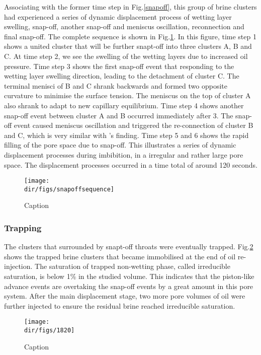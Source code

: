  Associating with the former time step in Fig.\ref{snapoff}, this group of brine clusters had experienced a series of dynamic displacement process of wetting layer swelling, snap-off, another snap-off and meniscus oscillation, reconnection and final snap-off. The complete sequence is shown in Fig.\ref{snapoffsequence}. In this figure, time step 1 shows a united cluster that will be further snapt-off into three clusters A, B and C. At time step 2, we see the swelling of the wetting layers due to increased oil pressure. Time step 3 shows the first snap-off event that responding to the wetting layer swelling direction, leading to the detachment of cluster C. The terminal menisci of B and C shrank backwards and formed two opposite curvature to minimise the surface tension. The meniscus on the top of cluster A also shrank to adapt to new capillary equilibrium. Time step 4 shows another snap-off event between cluster A and B occurred immediately after 3. The snap-off event caused meniscus oscillation and triggered the re-connection of cluster B and C, which is very similar with \citet{rucker2015connected}'s finding. Time step 5 and 6 shows the rapid filling of the pore space due to snap-off. This illustrates a series of dynamic displacement processes during imbibition, in a irregular and rather large pore space. The displacement processes occurred in a time total of around 120 seconds.
 
\begin{figure}
    \centering
    \texttt{[image: \\dir/figs/snapoffsequence]}
    \caption{Caption}
    \label{snapoffsequence}
\end{figure}

\subsubsection{Trapping}
The clusters that surrounded by snapt-off throats were eventually trapped. Fig.\ref{1820} shows the trapped brine clusters that became immobilised at the end of oil re-injection. The saturation of trapped non-wetting phase, called irreducible saturation, is below 1\% in the studied volume. This indicates that the piston-like advance events are overtaking the snap-off events by a great amount in this pore system. After the main displacement stage, two more pore volumes of oil were further injected to ensure the residual brine reached irreducible saturation.

\begin{figure}
    \centering
    \texttt{[image: \\dir/figs/1820]}
    \caption{Caption}
    \label{1820}
\end{figure}


